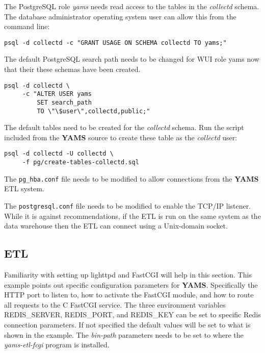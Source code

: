\documentclass[a4paper,twoside,12pt]{article}
\begin{document}
The PostgreSQL role \textit{yams} needs read access to the tables in the
\textit{collectd} schema.  The database administrator operating system user can
allow this from the command line:
\begin{lstlisting}
psql -d collectd -c "GRANT USAGE ON SCHEMA collectd TO yams;"
\end{lstlisting}

The default PostgreSQL search path needs to be changed for WUI role yams now
that their these schemas have been created.
\lstset{language=sh}
\begin{lstlisting}
psql -d collectd \
     -c "ALTER USER yams
         SET search_path
         TO \"\$user\",collectd,public;"
\end{lstlisting}

The default tables need to be created for the \textit{collectd} schema.  Run
the script included from the \textbf{YAMS} source to create these table as the
\textit{collectd} user:
\lstset{language=sh}
\begin{lstlisting}
psql -d collectd -U collectd \
     -f pg/create-tables-collectd.sql
\end{lstlisting}

The \texttt{pg\_hba.conf} file needs to be modified to allow connections from
the \textbf{YAMS} ETL system.

The \texttt{postgresql.conf} file needs to be modified to enable the TCP/IP
listener.  While it is against recommendations, if the ETL is run on the same
system as the data warehouse then the ETL can connect using a Unix-domain
socket.

\subsection{ETL}

Familiarity with setting up lighttpd and FastCGI will help in this section.
This example points out specific configuration parameters for \textbf{YAMS}.
Specifically the HTTP port to listen to, how to activate the FastCGI module,
and how to route all requests to the C FastCGI service.  The three environment
variables REDIS\_SERVER, REDIS\_PORT, and REDIS\_KEY can be set to specific
Redis connection parameters.  If not specified the default values will be set
to what is shown in the example.  The \textit{bin-path} parameters needs to be
set to where the \textit{yams-etl-fcgi} program is installed.
\end{document}
